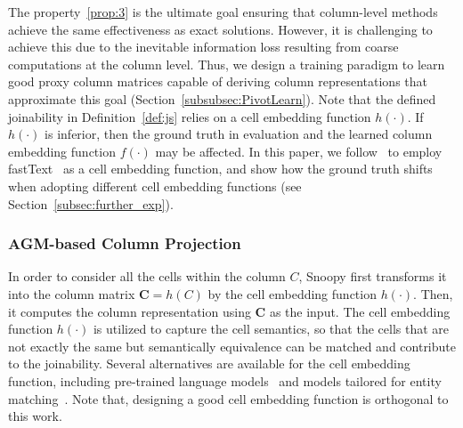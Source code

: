 The property~\ref{prop:3} is the ultimate goal ensuring that column-level methods achieve the same effectiveness as exact solutions.
However, it is challenging to achieve this due to the inevitable information loss resulting from coarse computations at the column level.  
Thus, we design a training paradigm to learn good proxy column matrices capable of deriving column representations that approximate this goal (Section~\ref{subsubsec:PivotLearn}). Note that the defined joinability in Definition~\ref{def:js} relies on a cell embedding function $h(\cdot)$. If $h(\cdot)$ is inferior, then the ground truth in evaluation and the learned  column embedding function $f(\cdot)$ may be affected.
In this paper, we follow~\cite{Pexeso} to employ fastText~\cite{fasttext} as a cell embedding function, and show how the ground truth shifts when adopting different cell embedding functions (see Section~\ref{subsec:further_exp}). 




\subsubsection{AGM-based Column Projection}
\label{subsec:ColRep}
In order to consider all the cells within the column $C$, 
\textsf{Snoopy} first transforms it into the column matrix $\mathbf{C} = h(C)$ by the cell embedding function $h(\cdot)$. 
Then, it computes the column
representation using $\mathbf{C}$ as the input. 
The cell embedding function $h(\cdot)$ is utilized to capture the cell semantics, so that the cells that are not exactly the same but semantically equivalence can be matched and contribute to the joinability.  
Several alternatives are available for the cell embedding function, including pre-trained language models~\cite{fasttext, sentencebert} and models tailored for entity matching~\cite{camper, ditto}.
Note that, designing a good cell embedding function is orthogonal to this work.





